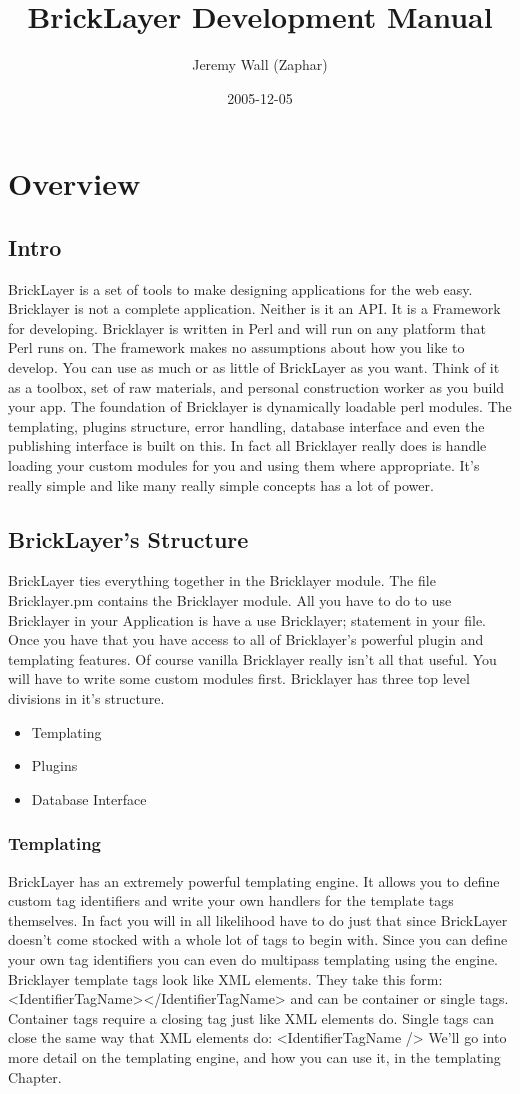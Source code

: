 \documentclass[letterpaper,10pt,oneside]{book}
\title{BrickLayer Development Manual}
\author{Jeremy Wall (Zaphar)}
\date{2005-12-05}
\begin{document}
\tableofcontents
\chapter{Overview}
\section{Intro}
BrickLayer is a set of tools to make designing applications for the web easy. Bricklayer is not a complete application. Neither is it an API. It is a Framework for developing. Bricklayer is written in Perl and will run on any platform that Perl runs on. The framework makes no assumptions about how you like to develop. You can use as much or as little of BrickLayer as you want. Think of it as a toolbox, set of raw materials, and personal construction worker as you build your app. The foundation of Bricklayer is dynamically loadable perl modules. The templating, plugins structure, error handling, database interface and even the publishing interface is built on this. In fact all Bricklayer really does is handle loading your custom modules for you and using them where appropriate. It's really simple and like many really simple concepts has a lot of power.
\section{BrickLayer's Structure}
BrickLayer ties everything together in the Bricklayer module. The file Bricklayer.pm contains the Bricklayer module. All you have to do to use Bricklayer in your Application is have a use Bricklayer; statement in your file. Once you have that you have access to all of Bricklayer's powerful plugin and templating features. Of course vanilla Bricklayer really isn't all that useful. You will have to write some custom modules first. Bricklayer has three top level divisions in it's structure.
\begin{itemize}
\item Templating
\item Plugins
\item Database Interface
\end{itemize}
\subsection*{Templating}
BrickLayer has an extremely powerful templating engine. It allows you to define custom tag identifiers and write your own handlers for the template tags themselves. In fact you will in all likelihood have to do just that since BrickLayer doesn't come stocked with a whole lot of tags to begin with. Since you can define your own tag identifiers you can even do multipass templating using the engine. Bricklayer template tags look like XML elements. They take this form: <IdentifierTagName></IdentifierTagName> and can be container or single tags. Container tags require a closing tag just like XML elements do. Single tags can close the same way that XML elements do: <IdentifierTagName /> We'll go into more detail on the templating engine, and how you can use it, in the templating Chapter.
\end{document}
